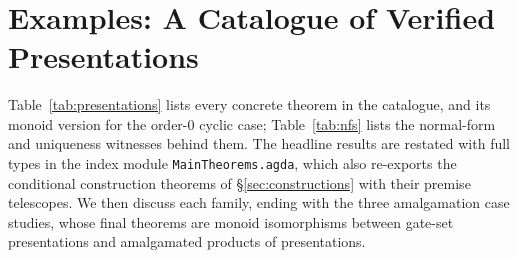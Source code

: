 \begin{code}[hide]
\<%
\\
\>[0]\AgdaSpace{}%
\AgdaSpace{}%
\AgdaSpace{}%
\<%
\\
%
\\[\AgdaEmptyExtraSkip]%
\>[0]\AgdaSpace{}%
\AgdaSpace{}%
\AgdaSpace{}%
\AgdaSymbol{(}\AgdaSpace{}%
\AgdaSymbol{;}\AgdaSpace{}%
\AgdaSpace{}%
\AgdaSymbol{)}\<%
\\
\>[0]\AgdaSpace{}%
\AgdaSpace{}%
\AgdaSpace{}%
\AgdaSymbol{(}\AgdaSymbol{)}\AgdaSpace{}%
\AgdaSpace{}%
\AgdaSymbol{(}\AgdaSpace{}%
\AgdaSpace{}%
\AgdaSymbol{)}\<%
\\
\>[0]\AgdaSpace{}%
\AgdaSpace{}%
\AgdaSpace{}%
\AgdaSymbol{(}\AgdaSymbol{)}\<%
\\
\>[0]\AgdaSpace{}%
\AgdaSpace{}%
\AgdaSpace{}%
\AgdaSymbol{(}\AgdaSymbol{)}\<%
\\
\>[0]\AgdaSpace{}%
\AgdaSpace{}%
\AgdaSpace{}%
\AgdaSymbol{(}\AgdaSymbol{)}\<%
\\
\>[0]\AgdaSpace{}%
\AgdaSpace{}%
\AgdaSpace{}%
\AgdaSymbol{(}\AgdaOperator{\AgdaDatatype{\AgdaUnderscore{}===\AgdaUnderscore{}}}\AgdaSpace{}%
\AgdaSymbol{;}\AgdaSpace{}%
\AgdaSpace{}%
\AgdaSymbol{;}\AgdaSpace{}%
\AgdaSymbol{)}\<%
\end{code}
\section{Examples: A Catalogue of Verified Presentations}\label{sec:examples}

Table~\ref{tab:presentations} lists
every concrete  theorem in the catalogue,
and its monoid version for the order-$0$ cyclic case;
Table~\ref{tab:nfs} lists the normal-form and uniqueness witnesses behind
them.  The headline results are restated with full types in the index module
\texttt{MainTheorems.agda}, which also re-exports the conditional
construction theorems of \S\ref{sec:constructions} with their premise
telescopes.  We then discuss each family, ending with the three
amalgamation case studies, whose final theorems are monoid
isomorphisms between gate-set presentations and amalgamated
products of presentations.

